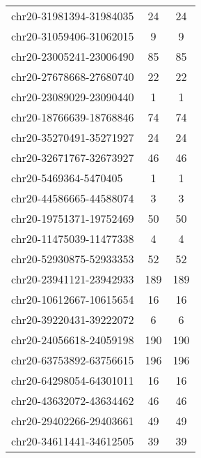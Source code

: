 \begin{longtable}{lSS}
	chr20-31981394-31984035 & 24     & 24                                        \\
	chr20-31059406-31062015 & 9      & 9                                         \\
	chr20-23005241-23006490 & 85     & 85                                        \\
	chr20-27678668-27680740 & 22     & 22                                        \\
	chr20-23089029-23090440 & 1      & 1                                         \\
	chr20-18766639-18768846 & 74     & 74                                        \\
	chr20-35270491-35271927 & 24     & 24                                        \\
	chr20-32671767-32673927 & 46     & 46                                        \\
	chr20-5469364-5470405   & 1      & 1                                         \\
	chr20-44586665-44588074 & 3      & 3                                         \\
	chr20-19751371-19752469 & 50     & 50                                        \\
	chr20-11475039-11477338 & 4      & 4                                         \\
	chr20-52930875-52933353 & 52     & 52                                        \\
	chr20-23941121-23942933 & 189    & 189                                       \\
	chr20-10612667-10615654 & 16     & 16                                        \\
	chr20-39220431-39222072 & 6      & 6                                         \\
	chr20-24056618-24059198 & 190    & 190                                       \\
	chr20-63753892-63756615 & 196    & 196                                       \\
	chr20-64298054-64301011 & 16     & 16                                        \\
	chr20-43632072-43634462 & 46     & 46                                        \\
	chr20-29402266-29403661 & 49     & 49                                        \\
	chr20-34611441-34612505 & 39     & 39                                        \\

\end{longtable}
